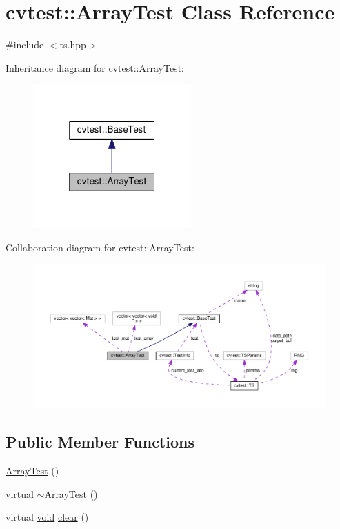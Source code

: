 \hypertarget{classcvtest_1_1ArrayTest}{\section{cvtest\-:\-:Array\-Test Class Reference}
\label{classcvtest_1_1ArrayTest}
}


{\ttfamily \#include $<$ts.\-hpp$>$}



Inheritance diagram for cvtest\-:\-:Array\-Test\-:\nopagebreak
\begin{figure}[H]
\begin{center}
\leavevmode
\includegraphics[width=172pt]{classcvtest_1_1ArrayTest__inherit__graph}
\end{center}
\end{figure}


Collaboration diagram for cvtest\-:\-:Array\-Test\-:\nopagebreak
\begin{figure}[H]
\begin{center}
\leavevmode
\includegraphics[width=350pt]{classcvtest_1_1ArrayTest__coll__graph}
\end{center}
\end{figure}
\subsection*{Public Member Functions}
\begin{DoxyCompactItemize}
\item 
\hyperlink{classcvtest_1_1ArrayTest_aaf0168374ed852379ab67059a43ef84a}{Array\-Test} ()
\item 
virtual \hyperlink{classcvtest_1_1ArrayTest_ace5a65f593283f5b870d60b408c8f358}{$\sim$\-Array\-Test} ()
\item 
virtual \hyperlink{legacy_8hpp_a8bb47f092d473522721002c86c13b94e}{void} \hyperlink{classcvtest_1_1ArrayTest_aad13acbabc4319d516e01382e277dfae}{clear} ()
\end{DoxyCompactItemize}
